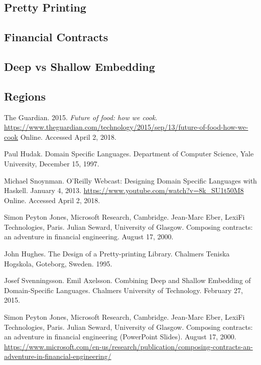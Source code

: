 \documentclass[11pt]{article}
\begin{document}
\subsection{Pretty Printing}
\subsection{Financial Contracts}
\subsection{Deep vs Shallow Embedding}
\subsection{Regions}
\newpage

    \begin{thebibliography}{8}

        The Guardian. 2015. \textit{Future of food: how we cook}.
        \url{https://www.theguardian.com/technology/2015/sep/13/future-of-food-how-we-cook}
        Online. Accessed April 2, 2018.

        Paul Hudak. Domain Specific Languages. Department of Computer
        Science, Yale University, December 15, 1997.

        Michael Snoynman. O'Reilly Webcast: Designing Domain Specific
        Languages with Haskell. January 4, 2013.
        \url{https://www.youtube.com/watch?v=8k_SU1t50M8}
        Online. Accessed April 2, 2018.

        Simon Peyton Jones, Microsoft Research, Cambridge.
        Jean-Marc Eber, LexiFi Technologies, Paris. Julian Seward,
        University of Glasgow. Composing contracts: an adventure in
        financial engineering. August 17, 2000.

        John Hughes. The Design of a Pretty-printing Library.
        Chalmers Teniska Hogskola, Goteborg, Sweden. 1995.

        Josef Svenningsson. Emil Axelsson. Combining Deep and Shallow
        Embedding of Domain-Specific Languages. Chalmers University
        of Technology. February 27, 2015.

        Simon Peyton Jones, Microsoft Research, Cambridge.
        Jean-Marc Eber, LexiFi Technologies, Paris. Julian Seward,
        University of Glasgow. Composing contracts: an adventure in
        financial engineering (PowerPoint Slides). August 17, 2000.
        \url{https://www.microsoft.com/en-us/research/publication/composing-contracts-an-adventure-in-financial-engineering/}


\end{thebibliography}
\end{document}
